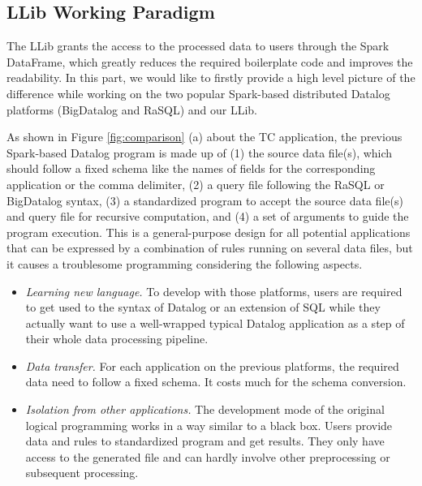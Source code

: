 \subsection{LLib Working Paradigm}
\label{sec:paradigm}

The LLib grants the access to the processed data to users through the Spark DataFrame, which greatly reduces the required boilerplate code and improves  the readability. In this part, we would like to firstly provide a high level picture of the difference while working on the two popular Spark-based distributed Datalog platforms (BigDatalog and RaSQL) and our LLib. 

As shown in Figure \ref{fig:comparison} (a) about the TC application, the previous Spark-based Datalog program is made up of (1) the  source data file(s), which should follow a fixed schema like  the names of fields for the corresponding application or the comma delimiter, (2) a query file following the RaSQL or BigDatalog syntax, (3) a standardized program to accept the source data file(s) and query file for recursive computation, and (4) a set of arguments to guide the program execution. This is a general-purpose design for all potential applications that can be expressed by a combination of rules running on several data files, but it causes a troublesome programming considering the following aspects.


\begin{itemize}
	\item \textit{Learning new language.} To develop with those platforms, users are required to get used to the syntax of Datalog or an extension of SQL while they actually  want to use a well-wrapped typical Datalog application as a step of their whole data processing pipeline.
	\item \textit{Data transfer.} For each application on the previous platforms, the required data need to follow a fixed schema. It costs much for the schema conversion.
	\item \textit {Isolation from other applications.} The development mode  of the original logical programming works in a way similar to a black box. Users provide data and rules to standardized program and get results. They only have access to the generated file and can hardly involve other  preprocessing or subsequent processing.  
\end{itemize}

